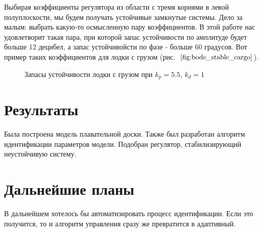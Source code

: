 \documentclass[12pt,a4paper]{article}
\begin{document}
Выбирая коэффициенты регулятора из области с тремя корнями в левой полуплоскости, мы будем получать устойчивые замкнутые системы. Дело за малым: выбрать какую-то осмысленную пару коэффициентов. В этой работе нас удовлетворит такая пара, при которой запас устойчивости по амплитуде будет больше 12 децибел, а запас устойчивойсти по фазе - больше 60 градусов. Вот пример таких коэффициентов для лодки с грузом (рис.~$\ref{fig:bode_stable_cargo}$). 

\begin{figure}
	\caption{Запасы устойчивости лодки с грузом при $k_p=5.5$, $k_d=1$}
	\label{fig:bode_stable_cargo}
\end{figure}

\section{Результаты}

Была построена модель плавательной доски. Также был разработан алгоритм идентификации параметров модели. Подобран регулятор, стабилизирующий неустойчивую систему.


\section{Дальнейшие планы}

В дальнейшем хотелось бы автоматизировать процесс идентификации. Если это получится, то и алгоритм управления сразу же превратится в адаптивный.

\newpage


\end{document}
